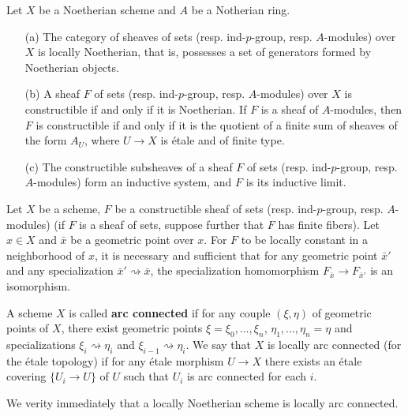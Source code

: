 \begin{proposition}\label{scheme Noe constructible sheaf iff Noe}
Let $X$ be a Noetherian scheme and $A$ be a Notherian ring.
\begin{enumerate}
    \item[(a)] The category of sheaves of sets (resp. ind-$p$-group, resp. $A$-modules) over $X$ is locally Noetherian, that is, possesses a set of generators formed by Noetherian objects.
    \item[(b)] A sheaf $F$ of sets (resp. ind-$p$-group, resp. $A$-modules) over $X$ is constructible if and only if it is Noetherian. If $F$ is a sheaf of $A$-modules, then $F$ is constructible if and only if it is the quotient of a finite sum of sheaves of the form $A_{U}$, where $U\to X$ is \'etale and of finite type.
    \item[(c)] The constructible subsheaves of a sheaf $F$ of sets (resp. ind-$p$-group, resp. $A$-modules) form an inductive system, and $F$ is its inductive limit.
\end{enumerate}
\end{proposition}

\begin{proposition}\label{scheme constructible iff stable under specialization}
Let $X$ be a scheme, $F$ be a constructible sheaf of sets (resp. ind-$p$-group, resp. $A$-modules) (if $F$ is a sheaf of sets, suppose further that $F$ has finite fibers). Let $x\in X$ and $\bar{x}$ be a geometric point over $x$. For $F$ to be locally constant in a neighborhood of $x$, it is necessary and sufficient that for any geometric point $\bar{x}'$ and any specialization $\bar{x}'\rightsquigarrow\bar{x}$, the specialization homomorphism $F_{\bar{x}}\to F_{\bar{x}'}$ is an isomorphism.
\end{proposition}

\begin{definition}
A scheme $X$ is called \textbf{arc connected} if for any couple $(\xi,\eta)$ of geometric points of $X$, there exist geometric points $\xi=\xi_0,\dots,\xi_n$, $\eta_1,\dots,\eta_n=\eta$ and specializations $\xi_i\rightsquigarrow\eta_i$ and $\xi_{i-1}\rightsquigarrow\eta_i$. We say that $X$ is locally arc connected (for the \'etale topology) if for any \'etale morphism $U\to X$ there exists an \'etale covering $\{U_i\to U\}$ of $U$ such that $U_i$ is arc connected for each $i$.
\end{definition}

We verity immediately that a locally Noetherian scheme is locally arc connected.

